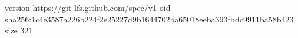 version https://git-lfs.github.com/spec/v1
oid sha256:1c4e3587a226b224f2e25227d9b1644702ba65018eeba393fbdc9911ba58b423
size 321
